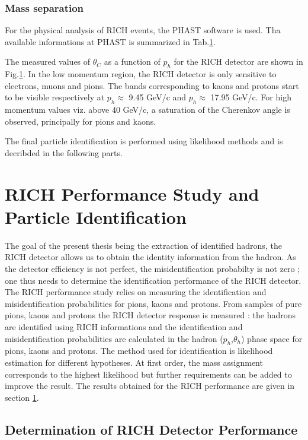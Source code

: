 \subsubsection*{Mass separation}

For the physical analysis of RICH events, the PHAST software is used. Tha available informations at PHAST is summarized in Tab.\ref{}.

The measured values of $\theta_C$ as a function of $p_h$ for the RICH detector are shown in Fig.\ref{}. In the low momentum region, the RICH detector is only
sensitive to electrons, muons and pions. The bands corresponding to kaons and protons start to be visible respectively at $p_h \approx$ 9.45 GeV/c and $p_h
\approx$ 17.95 GeV/c. For high momentum values viz. above 40 GeV/c, a saturation of the Cherenkov angle is observed, principally for pions and kaons.


The final particle identification is performed using likelihood methods and is decribded in the following parts.


\section{RICH Performance Study and Particle Identification}

The goal of the present thesis being the extraction of identified hadrons, the RICH detector allows us to obtain the identity information from the hadron.
As the detector efficiency is not perfect, the misidentification probabilty is not zero ; one thus needs to determine the identification performance of the
RICH detector.
The RICH performance study relies on measuring the identification and misidentification probabilities for pions, kaons and protons. From samples of pure pions,
kaons and protons the RICH detector response is measured : the hadrons are identified using RICH informations and the identification and misidentification
probabilities are calculated in the hadron ($p_h$,$\theta_h$) phase space for pions, kaons and protons. The method used for identification is likelihood estimation
for different hypotheses. At first order, the mass assignment corresponds to the highest likelihood but further requirements can be added to improve the result.
The results obtained for the RICH performance are given in section \ref{}.

\subsection*{Determination of RICH Detector Performance}

